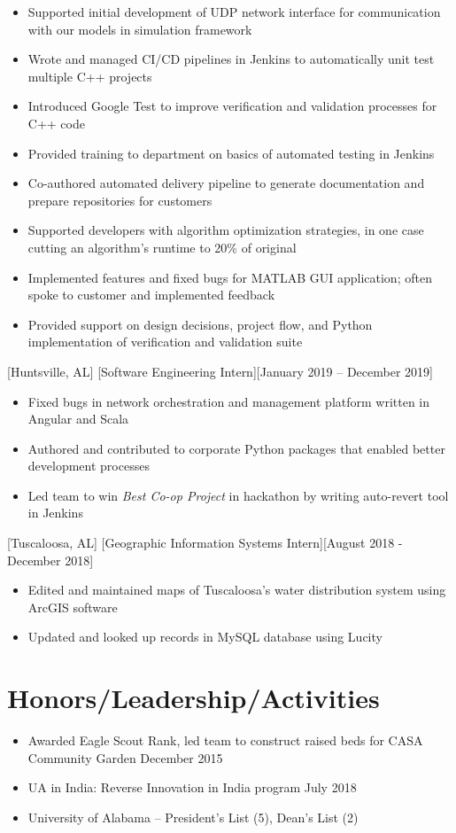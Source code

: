 \documentclass[hidelinks, 11pt]{article}
\begin{document}
\begin{itemize}
	\item Supported initial development of UDP network interface for communication with our models in simulation framework
	\item Wrote and managed CI/CD pipelines in Jenkins to automatically unit test multiple C++ projects
	\item Introduced Google Test to improve verification and validation processes for C++ code
	\item Provided training to department on basics of automated testing in Jenkins
	\item Co-authored automated delivery pipeline to generate documentation and prepare repositories for customers
	\item Supported developers with algorithm optimization strategies, in one case cutting an algorithm's runtime to 20\% of original
	\item Implemented features and fixed bugs for MATLAB GUI application; often spoke to customer and implemented feedback
	\item Provided support on design decisions, project flow, and Python implementation of verification and validation suite
\end{itemize}

[Huntsville, AL]
[Software Engineering Intern][January 2019 -- December 2019]

\begin{itemize}
	\item Fixed bugs in network orchestration and management platform written in Angular and Scala
	\item Authored and contributed to corporate Python packages that enabled better development processes
	\item Led team to win \textit{Best Co-op Project} in hackathon by writing auto-revert tool in Jenkins
\end{itemize}

[Tuscaloosa, AL]
[Geographic Information Systems Intern][August 2018 - December 2018]

\begin{itemize}
	\item Edited and maintained maps of Tuscaloosa’s water distribution system using ArcGIS software
	\item Updated and looked up records in MySQL database using Lucity
\end{itemize}

\section{Honors/Leadership/Activities}

\begin{itemize}
	\item Awarded Eagle Scout Rank, led team to construct raised beds for CASA Community Garden \hfill December 2015
	\item UA in India: Reverse Innovation in India program \hfill July 2018
	\item University of Alabama -- President's List (5), Dean's List (2)
\end{itemize}
\end{document}

